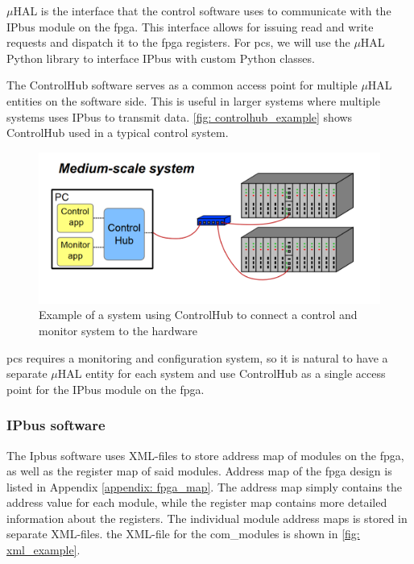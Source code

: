 \documentclass[main.tex]{subfiles}
\begin{document}
$\mu$HAL is the interface that the control software uses to communicate with the IPbus module on the \gls{fpga}. This interface allows for issuing read and write requests and dispatch it to the \gls{fpga} registers. For \gls{pcs}, we will use the $\mu$HAL Python library to interface IPbus with custom Python classes.

The ControlHub software serves as a common access point for multiple $\mu$HAL entities on the software side. This is useful in larger systems where multiple systems uses IPbus to transmit data. \autoref{fig: controlhub_example} shows ControlHub used in a typical control system.

\begin{figure}[!htpb]
    \centering
    \includegraphics[scale=0.3]{images/controlhub_example.png}
    \caption{Example of a system using ControlHub to connect a control and monitor system to the hardware\cite{IPbus}}
    \label{fig: controlhub_example}
\end{figure}
\FloatBarrier

\gls{pcs} requires a monitoring and configuration system, so it is natural to have a separate $\mu$HAL entity for each system and use ControlHub as a single access point for the IPbus module on the \gls{fpga}.

\subsubsection{IPbus software}


The Ipbus software uses XML-files to store address map of modules on the \gls{fpga}, as well as the register map of said modules. Address map of the \gls{fpga} design is listed in Appendix \ref{appendix: fpga_map}. The address map simply contains the address value for each module, while the register map contains more detailed information about the registers. The individual module address maps is stored in separate XML-files. the XML-file for the com\_modules is shown in \autoref{fig: xml_example}.
\end{document}
